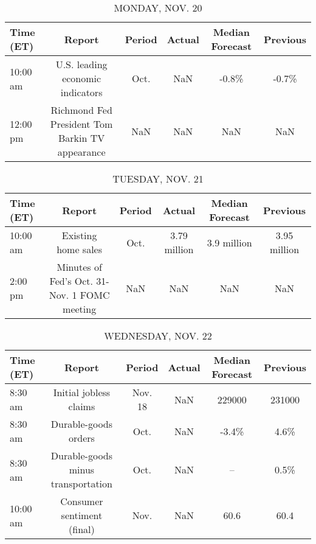 \documentclass{article}%
\begin{document}
%
\normalsize%


\begin{table}[htbp]%
\caption{MONDAY, NOV. 20}%
\centering%
\begin{adjustbox}{width=1\textwidth}%
\begin{tabular}{lccccc}
\toprule
Time (ET) &                                          Report & Period & Actual & Median Forecast & Previous \\
\midrule
 10:00 am &                U.S. leading economic indicators &   Oct. &    NaN &           -0.8\% &    -0.7\% \\
 12:00 pm & Richmond Fed President Tom Barkin TV appearance &    NaN &    NaN &             NaN &      NaN \\
\bottomrule
\end{tabular}
%
\end{adjustbox}%
\end{table}

%


\begin{table}[htbp]%
\caption{TUESDAY, NOV. 21}%
\centering%
\begin{adjustbox}{width=1\textwidth}%
\begin{tabular}{lccccc}
\toprule
Time (ET) &                                       Report & Period &       Actual & Median Forecast &     Previous \\
\midrule
 10:00 am &                          Existing home sales &   Oct. & 3.79 million &     3.9 million & 3.95 million \\
  2:00 pm & Minutes of Fed's Oct. 31-Nov. 1 FOMC meeting &    NaN &          NaN &             NaN &          NaN \\
\bottomrule
\end{tabular}
%
\end{adjustbox}%
\end{table}

%


\begin{table}[htbp]%
\caption{WEDNESDAY, NOV. 22}%
\centering%
\begin{adjustbox}{width=1\textwidth}%
\begin{tabular}{lccccc}
\toprule
Time (ET) &                             Report &  Period & Actual & Median Forecast & Previous \\
\midrule
  8:30 am &             Initial jobless claims & Nov. 18 &    NaN &          229000 &   231000 \\
  8:30 am &               Durable-goods orders &    Oct. &    NaN &           -3.4\% &     4.6\% \\
  8:30 am & Durable-goods minus transportation &    Oct. &    NaN &              -- &     0.5\% \\
 10:00 am &         Consumer sentiment (final) &    Nov. &    NaN &            60.6 &     60.4 \\
\bottomrule
\end{tabular}
%
\end{adjustbox}%
\end{table}
\end{document}
